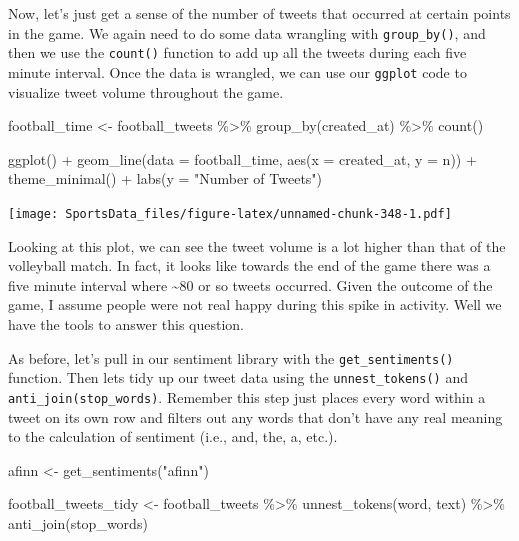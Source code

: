\documentclass[
]{book}
\newenvironment{Shaded}{\begin{snugshade}}{\end{snugshade}}
\newcommand{\AttributeTok}[1]{\textcolor[rgb]{0.77,0.63,0.00}{#1}}
\newcommand{\FunctionTok}[1]{\textcolor[rgb]{0.00,0.00,0.00}{#1}}
\newcommand{\NormalTok}[1]{#1}
\newcommand{\OtherTok}[1]{\textcolor[rgb]{0.56,0.35,0.01}{#1}}
\newcommand{\SpecialCharTok}[1]{\textcolor[rgb]{0.00,0.00,0.00}{#1}}
\newcommand{\StringTok}[1]{\textcolor[rgb]{0.31,0.60,0.02}{#1}}
\begin{document}
Now, let's just get a sense of the number of tweets that occurred at certain points in the game. We again need to do some data wrangling with \texttt{group\_by()}, and then we use the \texttt{count()} function to add up all the tweets during each five minute interval. Once the data is wrangled, we can use our \texttt{ggplot} code to visualize tweet volume throughout the game.

\begin{Shaded}
\begin{Highlighting}[]
\NormalTok{football\_time }\OtherTok{\textless{}{-}}\NormalTok{ football\_tweets }\SpecialCharTok{\%\textgreater{}\%}
  \FunctionTok{group\_by}\NormalTok{(created\_at) }\SpecialCharTok{\%\textgreater{}\%} 
  \FunctionTok{count}\NormalTok{()}

\FunctionTok{ggplot}\NormalTok{() }\SpecialCharTok{+}
  \FunctionTok{geom\_line}\NormalTok{(}\AttributeTok{data =}\NormalTok{ football\_time, }\FunctionTok{aes}\NormalTok{(}\AttributeTok{x =}\NormalTok{ created\_at, }\AttributeTok{y =}\NormalTok{ n)) }\SpecialCharTok{+}
  \FunctionTok{theme\_minimal}\NormalTok{() }\SpecialCharTok{+}
  \FunctionTok{labs}\NormalTok{(}\AttributeTok{y =} \StringTok{"Number of Tweets"}\NormalTok{)}
\end{Highlighting}
\end{Shaded}

\texttt{[image: SportsData\_files/figure-latex/unnamed-chunk-348-1.pdf]}

Looking at this plot, we can see the tweet volume is a lot higher than that of the volleyball match. In fact, it looks like towards the end of the game there was a five minute interval where \textasciitilde80 or so tweets occurred. Given the outcome of the game, I assume people were not real happy during this spike in activity. Well we have the tools to answer this question.

As before, let's pull in our sentiment library with the \texttt{get\_sentiments()} function. Then lets tidy up our tweet data using the \texttt{unnest\_tokens()} and \texttt{anti\_join(stop\_words)}. Remember this step just places every word within a tweet on its own row and filters out any words that don't have any real meaning to the calculation of sentiment (i.e., and, the, a, etc.).

\begin{Shaded}
\begin{Highlighting}[]
\NormalTok{afinn }\OtherTok{\textless{}{-}} \FunctionTok{get\_sentiments}\NormalTok{(}\StringTok{"afinn"}\NormalTok{)}

\NormalTok{football\_tweets\_tidy }\OtherTok{\textless{}{-}}\NormalTok{ football\_tweets }\SpecialCharTok{\%\textgreater{}\%} 
  \FunctionTok{unnest\_tokens}\NormalTok{(word, text) }\SpecialCharTok{\%\textgreater{}\%} 
  \FunctionTok{anti\_join}\NormalTok{(stop\_words) }
\end{Highlighting}
\end{Shaded}
\end{document}
